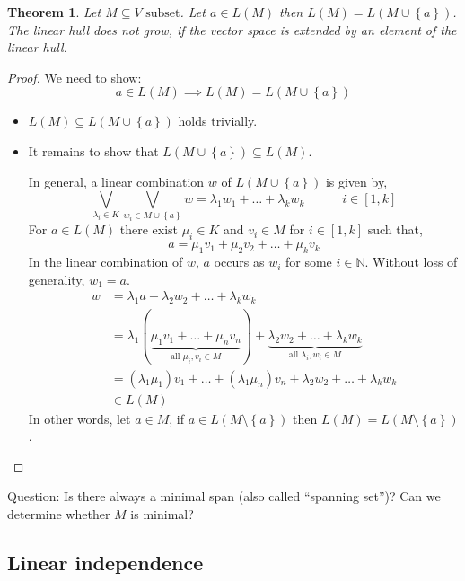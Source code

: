 \documentclass[a4paper,landscape,twocolumn]{article}
\newcommand\set[1]{\left\{#1\right\}}
\newtheorem{theorem}{Theorem}[section]
\begin{document}
\begin{theorem}
  \label{satz-3.15}
  Let $M \subseteq V \text{ subset}$.
  Let $a \in L(M)$ then $L(M) = L(M \cup \set{a})$.
  The linear hull does not grow, if the vector space is extended by an element of the linear hull.
\end{theorem}
\begin{proof}
  We need to show:
  \[ a \in L(M) \implies L(M) = L(M \cup \set{a}) \]
  \begin{itemize}
    \item $L(M) \subseteq L(M \cup \set{a})$ holds trivially.
    \item
      It remains to show that $L(M \cup \set{a}) \subseteq L(M)$.

      In general, a linear combination $w$ of $L(M \cup \set{a})$ is given by,
      \[
        \bigvee_{\lambda_i \in K} \bigvee_{w_i \in M \cup \set{a}}
        w = \lambda_1 w_1 + \ldots + \lambda_k w_k
        \quad\qquad i \in [1, k]
      \]
      For $a \in L(M)$ there exist $\mu_i \in K$ and $v_i \in M$ for $i \in [1, k]$ such that,
      \[ a = \mu_1 v_1 + \mu_2 v_2 + \ldots + \mu_k v_k \]
      In the linear combination of $w$, $a$ occurs as $w_i$ for some $i \in \mathbb N$.
      Without loss of generality, $w_1 = a$.
      \begin{align*}
        w &= \lambda_1 a + \lambda_2 w_2 + \ldots + \lambda_k w_k \\
          &= \lambda_1(\underbrace{\mu_1 v_1 + \ldots + \mu_n v_n}_{\text{all } \mu_i, v_i \in M})
          + \underbrace{\lambda_2 w_2 + \ldots + \lambda_k w_k}_{\text{all } \lambda_i, w_i \in M} \\
          &= (\lambda_1 \mu_1) v_1 + \ldots + (\lambda_1 \mu_n) v_n
          + \lambda_2 w_2 + \ldots + \lambda_k w_k \\
          &\in L(M)
      \end{align*}
    In other words, let $a \in M$, if $a \in L(M \setminus \set{a})$ then $L(M) = L(M \setminus \set{a})$.
  \end{itemize}
\end{proof}

\begin{center}
  Question:
  Is there always a minimal span (also called \enquote{spanning set})?
  Can we determine whether $M$ is minimal?
\end{center}

\subsection{Linear independence}
\end{document}
